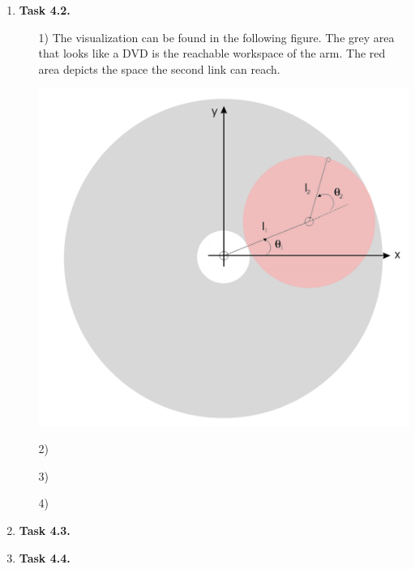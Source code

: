 \documentclass[a4paper,11pt]{article}
\begin{document}
\begin {enumerate}
		
	\item[\textbf{Task 4.2.}]
		\begin{enumerate}
			\item[1)] The visualization can be found in the following figure. The grey area that looks like a DVD is the reachable workspace of the arm. The red area depicts the space the second link can reach.
			\begin{center}
				\includegraphics[scale=0.2]{4-2-1.png}
			\end{center}
			
			\item[2)]
			
			\item[3)]
			
			\item[4)]
			
		\end{enumerate}				
		
		
	\item[\textbf{Task 4.3.}]

	\item[\textbf{Task 4.4.}]
	
\end {enumerate}
\end{document}
